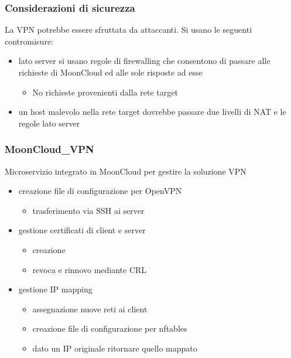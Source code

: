 \begin{frame}
    \frametitle{Considerazioni di sicurezza}
    La VPN potrebbe essere sfruttata da attaccanti. Si usano le seguenti contromisure:
    \begin{itemize}
        \item \alert{lato server} si usano \alert{regole di firewalling} che consentono
        di passare alle richieste di MoonCloud ed alle sole risposte ad esse
        \begin{itemize}
            \item No richieste provenienti dalla rete target
        \end{itemize}
        \item un \alert{host malevolo} nella rete target dovrebbe passare
        due livelli di NAT e le regole lato server
    \end{itemize}
\end{frame}


\begin{frame}
    \frametitle{MoonCloud\_VPN}
    \alert{Microservizio} integrato in MoonCloud per gestire la soluzione VPN
    \begin{itemize}
        \item creazione file di \alert{configurazione} per \alert{OpenVPN}
        \begin{itemize}
            \item \alert{trasferimento} via SSH ai server
        \end{itemize}
        \item gestione \alert{certificati} di client e server
        \begin{itemize}
            \item creazione
            \item revoca e rinnovo mediante \alert{CRL}
        \end{itemize}
        \item gestione \alert{IP mapping}
        \begin{itemize}
            \item assegnazione nuove reti ai client
            \item creazione file di \alert{configurazione} per \alert{nftables}
            \item dato un IP originale ritornare quello mappato
        \end{itemize}
    \end{itemize}
\end{frame}


